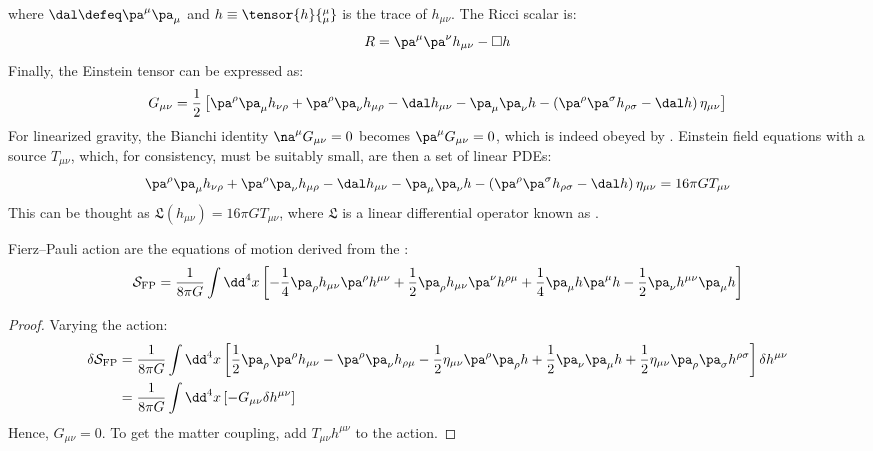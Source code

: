 where $ \dal \defeq \pa^\mu \pa_\mu $ and $ h \equiv \tensor{h}{^\mu_\mu} $ is the trace of $ h_{\mu \nu} $. The Ricci scalar is:
\begin{equation}
  R = \pa^\mu \pa^\nu h_{\mu \nu} - \Box h
\end{equation}
Finally, the Einstein tensor can be expressed as:
\begin{equation}
  G_{\mu \nu} = \frac{1}{2} \left[ \pa^\rho \pa_\mu h_{\nu \rho} + \pa^\rho \pa_\nu h_{\mu \rho} - \dal h_{\mu \nu} - \pa_\mu \pa_\nu h - \left( \pa^\rho \pa^\sigma h_{\rho \sigma} - \dal h \right) \eta_{\mu \nu} \right]
  \label{eq:weak-einst-tens}
\end{equation}
For linearized gravity, the Bianchi identity $ \na^\mu G_{\mu \nu} = 0 $ becomes $ \pa^\mu G_{\mu \nu} = 0 $, which is indeed obeyed by . Einstein field equations with a source $ T_{\mu \nu} $, which, for consistency, must be suitably small, are then a set of linear PDEs:
\begin{equation}
  \pa^\rho \pa_\mu h_{\nu \rho} + \pa^\rho \pa_\nu h_{\mu \rho} - \dal h_{\mu \nu} - \pa_\mu \pa_\nu h - \left( \pa^\rho \pa^\sigma h_{\rho \sigma} - \dal h \right) \eta_{\mu \nu} = 16\pi G T_{\mu \nu}
  \label{eq:weak-einst-feq}
\end{equation}
This can be thought as $ \mathfrak{L}(h_{\mu \nu}) = 16\pi G T_{\mu \nu} $, where $ \mathfrak{L} $ is a linear differential operator known as .

\begin{proposition}{Fierz--Pauli action}{}
   are the equations of motion derived from the :
  \begin{equation}
    \mathcal{S}_{\text{FP}} = \frac{1}{8\pi G} \int \dd^4 x \left[ - \frac{1}{4} \pa_\rho h_{\mu \nu} \pa^\rho h^{\mu \nu} + \frac{1}{2} \pa_\rho h_{\mu \nu} \pa^\nu h^{\rho \mu} + \frac{1}{4} \pa_\mu h \pa^\mu h - \frac{1}{2} \pa_\nu h^{\mu \nu} \pa_\mu h \right]
    \label{eq:weak-pf-action}
  \end{equation}
\end{proposition}

\begin{proofbox}
  \begin{proof}
    Varying the action:
    \begin{equation*}
      \begin{split}
        \delta \mathcal{S}_{\text{FP}}
        &= \frac{1}{8\pi G} \int \dd^4 x \left[ \frac{1}{2} \pa_\rho \pa^\rho h_{\mu \nu} - \pa^\rho \pa_\nu h_{\rho \mu} - \frac{1}{2} \eta_{\mu \nu} \pa^\rho \pa_\rho h + \frac{1}{2} \pa_\nu \pa_\mu h + \frac{1}{2} \eta_{\mu \nu} \pa_\rho \pa_\sigma h^{\rho \sigma} \right] \delta h^{\mu \nu} \\
        &= \frac{1}{8\pi G} \int \dd^4 x \left[ - G_{\mu \nu} \delta h^{\mu \nu} \right]
      \end{split}
    \end{equation*}
    Hence, $ G_{\mu \nu} = 0 $. To get the matter coupling, add $ T_{\mu \nu} h^{\mu \nu} $ to the action.
  \end{proof}
\end{proofbox}

